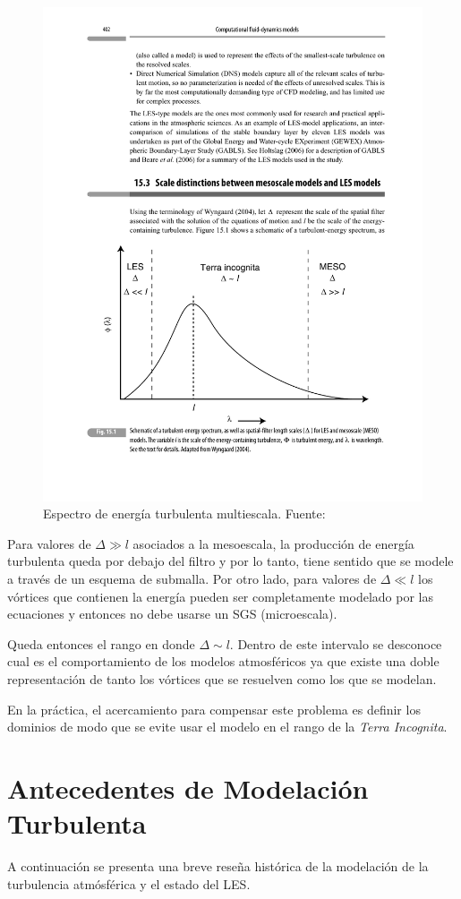 \begin{figure}[H]
	\centering
	\includegraphics[width=0.69\linewidth,trim={2cm 3.0cm 1.5cm 11.5cm},clip]{Imagenes/02/terra_inc}
	\caption{Espectro de energía turbulenta multiescala. Fuente: \cite{warner2010numerical}}
	\label{fig:02_terra_inc}
\end{figure}

Para valores de $\Delta\gg l$ asociados a la mesoescala, la producción de energía turbulenta queda por debajo del filtro y por lo tanto, tiene sentido que se modele a través de un esquema de submalla. Por otro lado, para valores de $\Delta\ll l$ los vórtices que contienen la energía pueden ser completamente modelado por las ecuaciones y entonces no debe usarse un SGS (microescala).

Queda entonces el rango en donde $\Delta\sim l$. Dentro de este intervalo se desconoce cual es el comportamiento de los modelos atmosféricos ya que existe una doble representación de tanto los vórtices que se resuelven como los que se modelan.

En la práctica, el acercamiento para compensar este problema es definir los dominios de modo que se evite usar el modelo en el rango de la \emph{Terra Incognita}.

\newpage
\section{Antecedentes de Modelación Turbulenta}
A continuación se presenta una breve reseña histórica de la modelación de la turbulencia atmósférica y el estado del LES.


